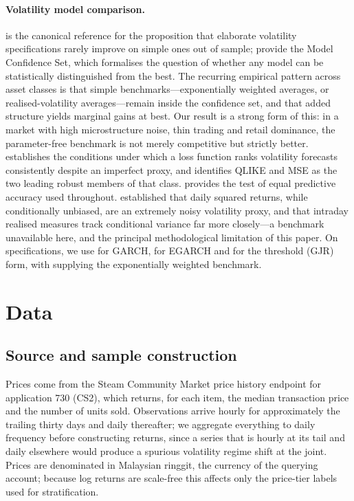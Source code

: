 \documentclass[11pt,a4paper]{article}
\begin{document}
\paragraph{Volatility model comparison.}
\citet{HansenLunde2005} is the canonical reference for the proposition that
elaborate volatility specifications rarely improve on simple ones out of
sample; \citet{HLN2011} provide the Model Confidence Set, which formalises
the question of whether any model can be statistically distinguished from the
best. The recurring empirical pattern across asset classes is that simple
benchmarks---exponentially weighted averages, or realised-volatility
averages---remain inside the confidence set, and that added structure yields
marginal gains at best. Our result is a strong form of this: in a market with
high microstructure noise, thin trading and retail dominance, the
parameter-free benchmark is not merely competitive but strictly better. \citet{Patton2011} establishes the conditions under which a loss
function ranks volatility forecasts consistently despite an imperfect proxy,
and identifies QLIKE and MSE as the two leading robust members of that class.
\citet{DieboldMariano1995} provides the test of equal predictive accuracy used
throughout. \citet{AndersenBollerslev1998} established that daily squared
returns, while conditionally unbiased, are an extremely noisy volatility
proxy, and that intraday realised measures track conditional variance far more
closely---a benchmark unavailable here, and the principal methodological
limitation of this paper. On specifications, we use \citet{Bollerslev1986} for GARCH,
\citet{Nelson1991} for EGARCH and \citet{Glosten1993} for the threshold
(GJR) form, with \citet{RiskMetrics1996} supplying the exponentially weighted
benchmark.

\section{Data}\label{sec:data}

\subsection{Source and sample construction}

Prices come from the Steam Community Market price history endpoint for
application 730 (CS2), which returns, for each item, the median transaction
price and the number of units sold. Observations arrive hourly for
approximately the trailing thirty days and daily thereafter; we aggregate
everything to daily frequency before constructing returns, since a series that
is hourly at its tail and daily elsewhere would produce a spurious volatility
regime shift at the joint. Prices are denominated in Malaysian ringgit, the
currency of the querying account; because log returns are scale-free this
affects only the price-tier labels used for stratification.
\end{document}
